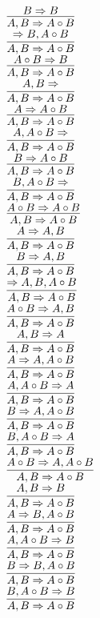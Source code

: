 \documentclass[11pt]{article}
\begin{document}
\begin{center}
\bigskip
\\$\infer{A, B\Rightarrow A\circ B}{B\Rightarrow B}$
\bigskip
\\$\infer{A, B\Rightarrow A\circ B}{\Rightarrow B, A\circ B}$
\bigskip
\\$\infer{A, B\Rightarrow A\circ B}{A\circ B\Rightarrow B}$
\bigskip
\\$\infer{A, B\Rightarrow A\circ B}{A, B\Rightarrow }$
\bigskip
\\$\infer{A, B\Rightarrow A\circ B}{A\Rightarrow A\circ B}$
\bigskip
\\$\infer{A, B\Rightarrow A\circ B}{A, A\circ B\Rightarrow }$
\bigskip
\\$\infer{A, B\Rightarrow A\circ B}{B\Rightarrow A\circ B}$
\bigskip
\\$\infer{A, B\Rightarrow A\circ B}{B, A\circ B\Rightarrow }$
\bigskip
\\$\infer{A, B\Rightarrow A\circ B}{A\circ B\Rightarrow A\circ B}$
\bigskip
\\$\infer{A, B\Rightarrow A\circ B}{A\Rightarrow A, B}$
\bigskip
\\$\infer{A, B\Rightarrow A\circ B}{B\Rightarrow A, B}$
\bigskip
\\$\infer{A, B\Rightarrow A\circ B}{\Rightarrow A, B, A\circ B}$
\bigskip
\\$\infer{A, B\Rightarrow A\circ B}{A\circ B\Rightarrow A, B}$
\bigskip
\\$\infer{A, B\Rightarrow A\circ B}{A, B\Rightarrow A}$
\bigskip
\\$\infer{A, B\Rightarrow A\circ B}{A\Rightarrow A, A\circ B}$
\bigskip
\\$\infer{A, B\Rightarrow A\circ B}{A, A\circ B\Rightarrow A}$
\bigskip
\\$\infer{A, B\Rightarrow A\circ B}{B\Rightarrow A, A\circ B}$
\bigskip
\\$\infer{A, B\Rightarrow A\circ B}{B, A\circ B\Rightarrow A}$
\bigskip
\\$\infer{A, B\Rightarrow A\circ B}{A\circ B\Rightarrow A, A\circ B}$
\bigskip
\\$\infer{A, B\Rightarrow A\circ B}{A, B\Rightarrow B}$
\bigskip
\\$\infer{A, B\Rightarrow A\circ B}{A\Rightarrow B, A\circ B}$
\bigskip
\\$\infer{A, B\Rightarrow A\circ B}{A, A\circ B\Rightarrow B}$
\bigskip
\\$\infer{A, B\Rightarrow A\circ B}{B\Rightarrow B, A\circ B}$
\bigskip
\\$\infer{A, B\Rightarrow A\circ B}{B, A\circ B\Rightarrow B}$

\end{center}
\end{document}
